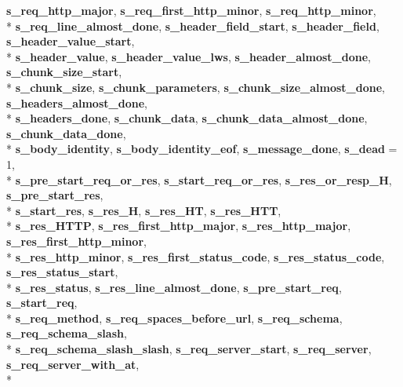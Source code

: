 \begin{DoxyCompactItemize}
{\bf s\+\_\+req\+\_\+http\+\_\+major}, 
{\bf s\+\_\+req\+\_\+first\+\_\+http\+\_\+minor}, 
{\bf s\+\_\+req\+\_\+http\+\_\+minor}, 
\\*
{\bf s\+\_\+req\+\_\+line\+\_\+almost\+\_\+done}, 
{\bf s\+\_\+header\+\_\+field\+\_\+start}, 
{\bf s\+\_\+header\+\_\+field}, 
{\bf s\+\_\+header\+\_\+value\+\_\+start}, 
\\*
{\bf s\+\_\+header\+\_\+value}, 
{\bf s\+\_\+header\+\_\+value\+\_\+lws}, 
{\bf s\+\_\+header\+\_\+almost\+\_\+done}, 
{\bf s\+\_\+chunk\+\_\+size\+\_\+start}, 
\\*
{\bf s\+\_\+chunk\+\_\+size}, 
{\bf s\+\_\+chunk\+\_\+parameters}, 
{\bf s\+\_\+chunk\+\_\+size\+\_\+almost\+\_\+done}, 
{\bf s\+\_\+headers\+\_\+almost\+\_\+done}, 
\\*
{\bf s\+\_\+headers\+\_\+done}, 
{\bf s\+\_\+chunk\+\_\+data}, 
{\bf s\+\_\+chunk\+\_\+data\+\_\+almost\+\_\+done}, 
{\bf s\+\_\+chunk\+\_\+data\+\_\+done}, 
\\*
{\bf s\+\_\+body\+\_\+identity}, 
{\bf s\+\_\+body\+\_\+identity\+\_\+eof}, 
{\bf s\+\_\+message\+\_\+done}, 
{\bf s\+\_\+dead} = 1, 
\\*
{\bf s\+\_\+pre\+\_\+start\+\_\+req\+\_\+or\+\_\+res}, 
{\bf s\+\_\+start\+\_\+req\+\_\+or\+\_\+res}, 
{\bf s\+\_\+res\+\_\+or\+\_\+resp\+\_\+H}, 
{\bf s\+\_\+pre\+\_\+start\+\_\+res}, 
\\*
{\bf s\+\_\+start\+\_\+res}, 
{\bf s\+\_\+res\+\_\+H}, 
{\bf s\+\_\+res\+\_\+\+HT}, 
{\bf s\+\_\+res\+\_\+\+H\+TT}, 
\\*
{\bf s\+\_\+res\+\_\+\+H\+T\+TP}, 
{\bf s\+\_\+res\+\_\+first\+\_\+http\+\_\+major}, 
{\bf s\+\_\+res\+\_\+http\+\_\+major}, 
{\bf s\+\_\+res\+\_\+first\+\_\+http\+\_\+minor}, 
\\*
{\bf s\+\_\+res\+\_\+http\+\_\+minor}, 
{\bf s\+\_\+res\+\_\+first\+\_\+status\+\_\+code}, 
{\bf s\+\_\+res\+\_\+status\+\_\+code}, 
{\bf s\+\_\+res\+\_\+status\+\_\+start}, 
\\*
{\bf s\+\_\+res\+\_\+status}, 
{\bf s\+\_\+res\+\_\+line\+\_\+almost\+\_\+done}, 
{\bf s\+\_\+pre\+\_\+start\+\_\+req}, 
{\bf s\+\_\+start\+\_\+req}, 
\\*
{\bf s\+\_\+req\+\_\+method}, 
{\bf s\+\_\+req\+\_\+spaces\+\_\+before\+\_\+url}, 
{\bf s\+\_\+req\+\_\+schema}, 
{\bf s\+\_\+req\+\_\+schema\+\_\+slash}, 
\\*
{\bf s\+\_\+req\+\_\+schema\+\_\+slash\+\_\+slash}, 
{\bf s\+\_\+req\+\_\+server\+\_\+start}, 
{\bf s\+\_\+req\+\_\+server}, 
{\bf s\+\_\+req\+\_\+server\+\_\+with\+\_\+at}, 
\\*

\end{DoxyCompactItemize}
